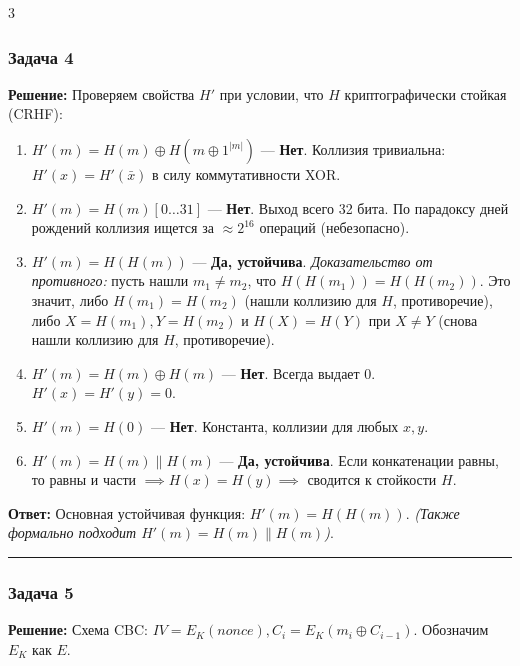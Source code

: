 ﻿\documentclass[9pt,a4paper,landscape]{extarticle}
\newcommand{\tightlist}{}
\begin{document}
\begin{multicols*}{3}
\subsubsection{Задача 4}\label{ux437ux430ux434ux430ux447ux430-4}

\textbf{Решение:} Проверяем свойства \(H'\) при условии, что \(H\) криптографически стойкая (CRHF):

\begin{enumerate}
\def\labelenumi{\arabic{enumi}.}
\tightlist
\item
  \(H'(m) = H(m) \oplus H(m \oplus 1^{|m|})\) --- \textbf{Нет}. Коллизия тривиальна: \(H'(x) = H'(\bar{x})\) в силу коммутативности XOR.
\item
  \(H'(m) = H(m)[0\dots31]\) --- \textbf{Нет}. Выход всего 32 бита. По парадоксу дней рождений коллизия ищется за \(\approx 2^{16}\) операций (небезопасно).
\item
  \(H'(m) = H(H(m))\) --- \textbf{Да, устойчива}. \emph{Доказательство от противного:} пусть нашли \(m_1 \neq m_2\), что \(H(H(m_1)) = H(H(m_2))\). Это значит, либо \(H(m_1) = H(m_2)\) (нашли коллизию для \(H\), противоречие), либо \(X = H(m_1), Y = H(m_2)\) и \(H(X) = H(Y)\) при \(X \neq Y\) (снова нашли коллизию для \(H\), противоречие).
\item
  \(H'(m) = H(m) \oplus H(m)\) --- \textbf{Нет}. Всегда выдает 0. \(H'(x) = H'(y) = 0\).
\item
  \(H'(m) = H(0)\) --- \textbf{Нет}. Константа, коллизии для любых \(x, y\).
\item
  \(H'(m) = H(m) \parallel H(m)\) --- \textbf{Да, устойчива}. Если конкатенации равны, то равны и части \(\implies H(x)=H(y) \implies\) сводится к стойкости \(H\).
\end{enumerate}

\textbf{Ответ:} Основная устойчивая функция: \textbf{\(H'(m) = H(H(m))\)}. \emph{(Также формально подходит \(H'(m) = H(m) \parallel H(m)\))}.

\begin{center}\rule{0.5\linewidth}{0.5pt}\end{center}

\subsubsection{Задача 5}\label{ux437ux430ux434ux430ux447ux430-5}

\textbf{Решение:} Схема CBC: \(IV = E_K(nonce), C_i = E_K(m_i \oplus C_{i-1})\). Обозначим \(E_K\) как \(E\).


\end{multicols*}
\end{document}
